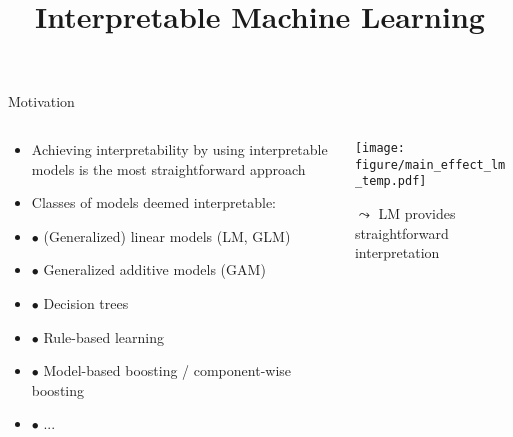 \documentclass[11pt,compress,t,notes=noshow, aspectratio=169, xcolor=table]{beamer}
\title{Interpretable Machine Learning}
\date{}
\begin{document}
 

\newcommand{\titlefigure}{figure/whitebox}
\newcommand{\learninggoals}{
\item Why should we use interpretable models?
\item Advantages and disadvantages of interpretable models
}


\begin{frame}{Motivation}
\begin{columns}[T, totalwidth = \textwidth]
    \begin{column}{0.55\textwidth}
    \begin{itemize}
       \item Achieving interpretability by using interpretable models is the most straightforward approach
        \bigskip
        \item Classes of models deemed interpretable:
            \item[] $\bullet$ (Generalized) linear models (LM, GLM)
            \item[] $\bullet$ Generalized additive models (GAM)
            \item[] $\bullet$ Decision trees
            \item[] $\bullet$ Rule-based learning
            \item[] $\bullet$ Model-based boosting / component-wise boosting
            \item[] $\bullet$ ...
    \end{itemize}
    \end{column}
    \begin{column}{0.44\textwidth}  %
  \texttt{[image: figure/main\_effect\_lm\_temp.pdf]}
  \begin{center}
    $\leadsto$ LM provides straightforward interpretation
  \end{center}
    \end{column}
\end{columns}
\end{frame}
\end{document}
